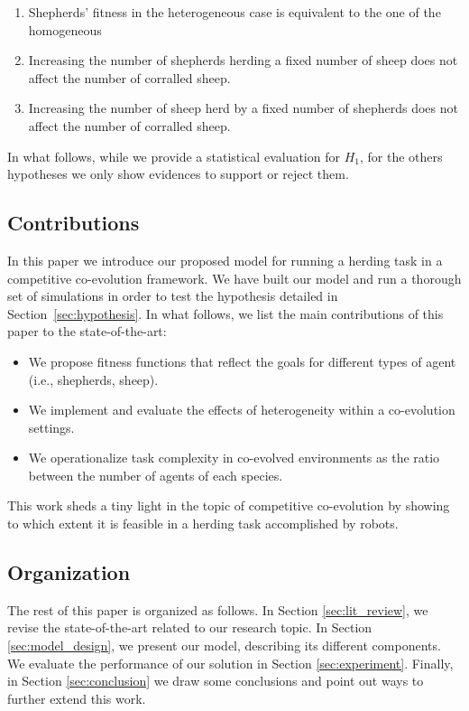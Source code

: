 \documentclass[conference]{IEEEtran}
\begin{document}
\begin{enumerate}
	\item Shepherds' fitness in the heterogeneous case is equivalent to the one of the homogeneous
	\item Increasing the number of shepherds herding a fixed number of sheep does not affect the number of corralled sheep.
	\item Increasing the number of sheep herd by a fixed number of shepherds does not affect the number of corralled sheep.
\end{enumerate}
In what follows, while we provide a statistical evaluation for $H_1$, for the others hypotheses we only show evidences to support or reject them.

\subsection{Contributions}
In this paper we introduce our proposed model for running a herding task in a competitive co-evolution framework. 
We have built our model and run a thorough set of simulations in order to test the hypothesis detailed in Section~\ref{sec:hypothesis}. 
In what follows, we list the main contributions of this paper to the state-of-the-art:
\begin{itemize}
	\item We propose fitness functions that reflect the goals for different types of agent (i.e., shepherds, sheep).
	\item We implement and evaluate the effects of heterogeneity within a co-evolution settings.
	\item We operationalize task complexity in co-evolved environments as the ratio between the number of agents of each species.
\end{itemize}

This work sheds a tiny light in the topic of competitive co-evolution by showing to which extent it is feasible in a herding task accomplished by robots.

\subsection{Organization}
The rest of this paper is organized as follows. 
In Section \ref{sec:lit_review}, we revise the state-of-the-art related to our research topic. 
In Section \ref{sec:model_design}, we present our model, describing its different components. 
We evaluate the performance of our solution in Section \ref{sec:experiment}. 
Finally, in Section \ref{sec:conclusion} we draw some conclusions and point out ways to further extend this work.
\end{document}
